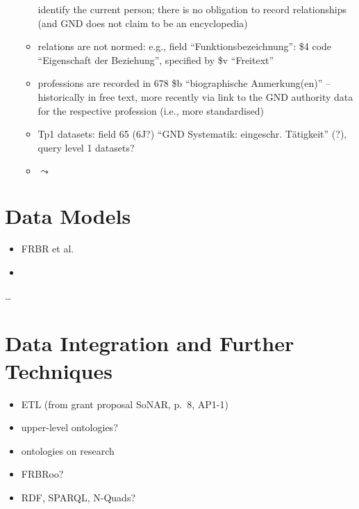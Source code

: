 \begin{itemize}
\begin{itemize}
        identify the current person; there is no obligation to record relationships
        (and GND does not claim to be an encyclopedia)
      \item
        relations are not normed:
        e.g., field \enquote{Funktionsbezeichnung}: \$4 code \enquote{Eigenschaft der Beziehung},
        specified by \$v \enquote{Freitext}
      \item
        professions are recorded in 678 \$b \enquote{biographische Anmerkung(en)} --
        historically in free text,
        more recently via link to the GND authority data for the respective profession (i.e., more standardised)
      \item
        Tp1 datasets: field 65 (6J?) \enquote{GND Systematik: eingeschr. Tätigkeit} (?),
        query level 1 datasets?
      \item
        $\leadsto$ 
    \end{itemize}
\end{itemize}

\section{Data Models}
\label{sec:data_models}

\begin{itemize}
  \item
    FRBR et al.
  \item 
\end{itemize}

\dots

\section{Data Integration and Further Techniques}
\label{sec:data_integration}

\begin{itemize}
  \item 
    ETL (from grant proposal \gls{SoNAR}, p.~8, AP1-1)
  \item
    upper-level ontologies?
  \item 
    ontologies on research
  \item
    FRBRoo?
  \item
    RDF, SPARQL, N-Quads?
\end{itemize}


